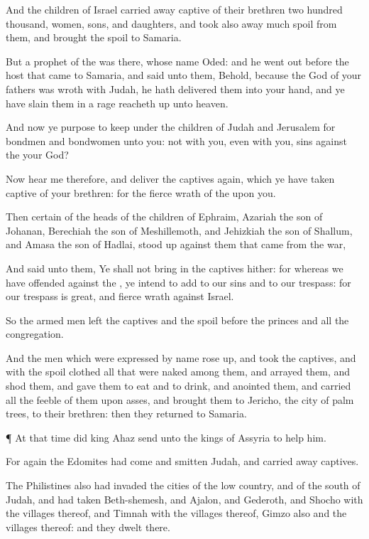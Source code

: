 {And the
children of
Israel carried away
captive of their
brethren two
hundred
thousand,
women,
sons, and
daughters, and took also
away
much
spoil from them, and
brought the
spoil to
Samaria.

But a
prophet of the
{} was there, whose
name
{}
Oded: and he went
out
before the
host that
came to
Samaria, and
said unto them, Behold, because the
{}
God of your
fathers was
wroth with
Judah, he hath
delivered them into your
hand, and ye have
slain them in a
rage
{} reacheth
up unto
heaven.

And now ye
purpose to keep
under the
children of
Judah and
Jerusalem for
bondmen and
bondwomen unto you:
{} not with you,
even with you,
sins against the
{} your
God?

Now
hear me therefore, and
deliver the
captives again, which ye have taken
captive of your
brethren: for the
fierce
wrath of the
{}
{} upon you.

Then
certain of the
heads of the
children of
Ephraim,
Azariah the
son of
Johanan,
Berechiah the
son of
Meshillemoth, and
Jehizkiah the
son of
Shallum, and
Amasa the
son of
Hadlai, stood
up against them that
came from the
war,

And
said unto them, Ye shall not bring
in the
captives hither: for whereas we have
offended against the
{}
{}, ye
intend to
add
{} to our
sins and to our
trespass: for our
trespass is
great, and
{}
fierce
wrath against
Israel.

So the armed
men
left the
captives and the
spoil
before the
princes and all the
congregation.

And the
men which were
expressed by
name rose
up, and
took the
captives, and with the
spoil
clothed all that were
naked among them, and
arrayed them, and
shod them, and gave them to
eat and to
drink, and
anointed them, and
carried all the
feeble of them upon
asses, and
brought them to
Jericho, the
city of palm
trees,
to their
brethren: then they
returned to
Samaria.


\par }{\PP {}¶ At that
time did
king
Ahaz
send unto the
kings of
Assyria to
help him.

For again the
Edomites had
come and
smitten
Judah, and carried
away
captives.

The
Philistines also had
invaded the
cities of the low
country, and of the
south of
Judah, and had
taken
Beth-shemesh, and
Ajalon, and
Gederoth, and
Shocho with the
villages thereof, and
Timnah with the
villages thereof,
Gimzo also and the
villages thereof: and they
dwelt there.

}
